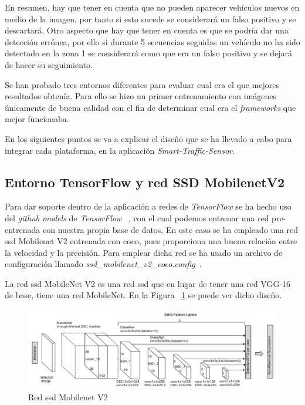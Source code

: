 En resumen, hay que tener en cuenta que no pueden aparecer vehículos nuevos en medio de la imagen, por tanto si esto sucede se considerará un falso positivo y se descartará. Otro aspecto que hay que tener en cuenta es que se podría dar una detección errónea, por ello si durante 5 secuencias seguidas un vehículo no ha sido detectado en la zona 1 se considerará como que era un falso positivo y se dejará de hacer su seguimiento.

Se han probado tres entornos diferentes para evaluar cual era el que mejores resultados obtenía. Para ello se hizo un primer entrenamiento con imágenes únicamente de buena calidad con el fin de determinar cual era el \textit{frameworks} que mejor funcionaba.


En los siguientes puntos se va a explicar el diseño que se ha llevado a cabo para integrar cada plataforma, en la aplicación \textit{Smart-Traffic-Sensor}.

\subsection{Entorno TensorFlow y red SSD MobilenetV2}

Para dar soporte dentro de la aplicación a redes de \textit{TensorFlow} se ha hecho uso del \textit{github models} de \textit{TensorFlow} ~\cite{tensorflow_models}, con el cual podemos entrenar una red pre-entrenada con nuestra propia base de datos. En este caso se ha empleado una red \acrfull{ssd} Mobilenet V2 entrenada con \acrshort{coco}, pues proporciona una buena relación entre la velocidad y la precisión. Para emplear dicha red se ha usado un archivo de configuración llamado \textit{ssd\_mobilenet\_v2\_coco.config}~\cite{ssd_mobilenetv2_config}.

La red \acrshort{ssd} MobileNet V2 es una red \acrshort{ssd} que en lugar de tener una red VGG-16 de base, tiene una red MobileNet. En la Figura ~\ref{fig.ssd_mobilenet} se puede ver dicho diseño.

\begin{figure}[H] 
\begin{center}
	\includegraphics[width=1\textwidth]{figures/Diseno_global/ssd_mobilenet.png}
   \caption{Red \acrshort{ssd} Mobilenet V2}
	\label{fig.ssd_mobilenet}
\end{center}
\end{figure}

